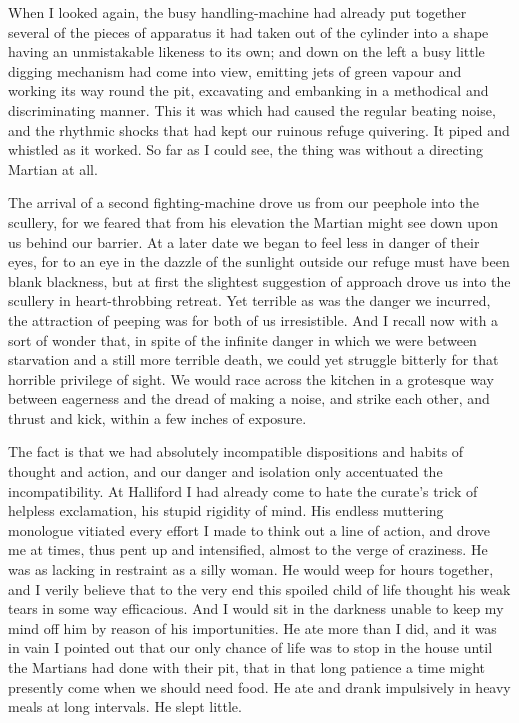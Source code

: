 When I looked again, the busy handling-machine had already put
together several of the pieces of apparatus it had taken out of the
cylinder into a shape having an unmistakable likeness to its own;
and down on the left a busy little digging mechanism had come into
view, emitting jets of green vapour and working its way round the
pit, excavating and embanking in a methodical and discriminating
manner. This it was which had caused the regular beating noise, and
the rhythmic shocks that had kept our ruinous refuge quivering. It
piped and whistled as it worked. So far as I could see, the thing
was without a directing Martian at all.

The arrival of a second fighting-machine drove us from our peephole
into the scullery, for we feared that from his elevation the
Martian might see down upon us behind our barrier. At a later date
we began to feel less in danger of their eyes, for to an eye in the
dazzle of the sunlight outside our refuge must have been blank
blackness, but at first the slightest suggestion of approach drove
us into the scullery in heart-throbbing retreat. Yet terrible as
was the danger we incurred, the attraction of peeping was for both
of us irresistible. And I recall now with a sort of wonder that, in
spite of the infinite danger in which we were between starvation
and a still more terrible death, we could yet struggle bitterly for
that horrible privilege of sight. We would race across the kitchen
in a grotesque way between eagerness and the dread of making a
noise, and strike each other, and thrust and kick, within a few
inches of exposure.

The fact is that we had absolutely incompatible dispositions and
habits of thought and action, and our danger and isolation only
accentuated the incompatibility. At Halliford I had already come to
hate the curate's trick of helpless exclamation, his stupid
rigidity of mind. His endless muttering monologue vitiated every
effort I made to think out a line of action, and drove me at times,
thus pent up and intensified, almost to the verge of craziness. He
was as lacking in restraint as a silly woman. He would weep for
hours together, and I verily believe that to the very end this
spoiled child of life thought his weak tears in some way
efficacious. And I would sit in the darkness unable to keep my mind
off him by reason of his importunities. He ate more than I did, and
it was in vain I pointed out that our only chance of life was to
stop in the house until the Martians had done with their pit, that
in that long patience a time might presently come when we should
need food. He ate and drank impulsively in heavy meals at long
intervals. He slept little.

